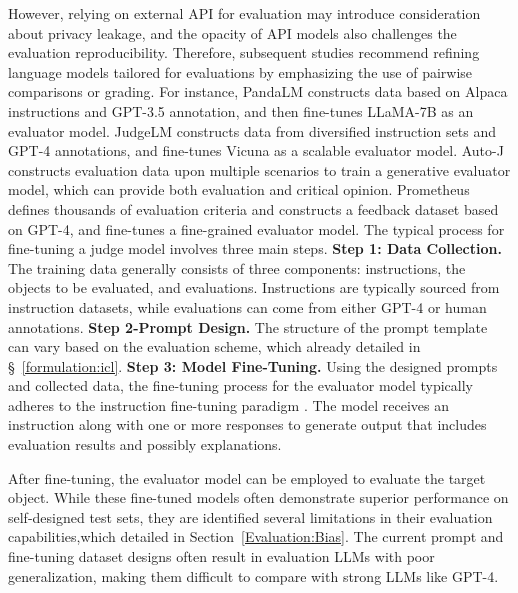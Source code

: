 However, relying on external API for evaluation may introduce consideration about privacy leakage, and the opacity of API models also challenges the evaluation reproducibility. Therefore, subsequent studies recommend refining language models tailored for evaluations by emphasizing the use of pairwise comparisons or grading.
For instance, PandaLM \cite{wang2023pandalm} constructs data based on Alpaca instructions and GPT-3.5 annotation, and then fine-tunes LLaMA-7B \cite{touvron2023llama} as an evaluator model. JudgeLM \cite{zhu2023judgelm} constructs data from diversified instruction sets and GPT-4 annotations, and fine-tunes Vicuna \cite{vicuna2023} as a scalable evaluator model. Auto-J \cite{auto-j} constructs evaluation data upon multiple scenarios to train a generative evaluator model, which can provide both evaluation and critical opinion. Prometheus \cite{prometheus} defines thousands of evaluation criteria and constructs a feedback dataset based on GPT-4, and fine-tunes a fine-grained evaluator model. 
The typical process for fine-tuning a judge model involves three main steps.
\noindent\textbf{Step 1: Data Collection.} The training data generally consists of three components: instructions, the objects to be evaluated, and evaluations. Instructions are typically sourced from instruction datasets, while evaluations can come from either GPT-4 or human annotations.
\noindent\textbf{Step 2-Prompt Design.} The structure of the prompt template can vary based on the evaluation scheme, which already detailed in \S~\ref{formulation:icl}.
\noindent\textbf{Step 3: Model Fine-Tuning.} Using the designed prompts and collected data, the fine-tuning process for the evaluator model typically adheres to the instruction fine-tuning paradigm \cite{ouyang2022training}. The model receives an instruction along with one or more responses to generate output that includes evaluation results and possibly explanations.



After fine-tuning, the evaluator model can be employed to evaluate the target object. While these fine-tuned models often demonstrate superior performance on self-designed test sets, they are identified several limitations in their evaluation capabilities,which detailed in Section~\ref{Evaluation:Bias}.  The current prompt and fine-tuning dataset designs often result in evaluation LLMs with poor generalization, making them difficult to compare with strong LLMs like GPT-4.


